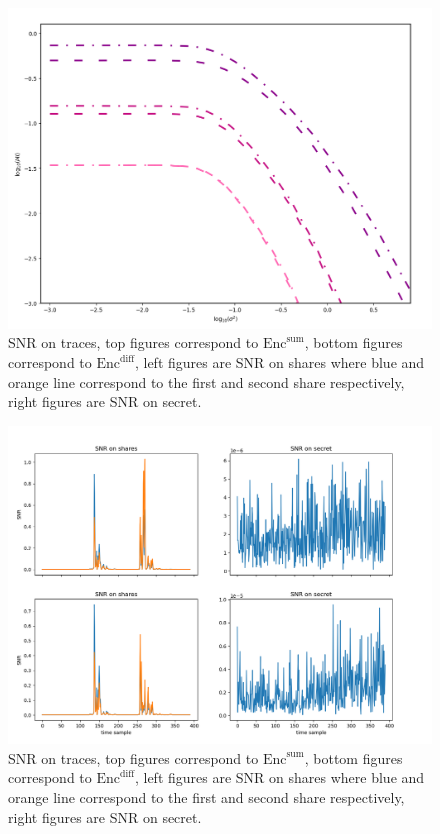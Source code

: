 \documentclass{llncs}
\begin{document}
\begin{figure}
	\vspace*{-0.0cm}
	\hspace*{0.0cm}\centering \includegraphics[width=12.0cm]{figures/MI_23_234.png}
	\vspace*{0.3cm}
	\caption{SNR on traces, top figures correspond to $\text{Enc}^{\text{sum}}$, bottom figures correspond to $\text{Enc}^{\text{diff}}$, left figures are SNR on shares where blue and orange line correspond to the first and second share respectively, right figures are SNR on secret.}\label{fig:miq23}\vspace*{-0.0cm}
\end{figure}
\begin{figure}
	\vspace*{-0.0cm}
	\hspace*{0.0cm}\centering \includegraphics[width=12.0cm]{figures/snr_2shares.png}
	\vspace*{0.3cm}
	\caption{SNR on traces, top figures correspond to $\text{Enc}^{\text{sum}}$, bottom figures correspond to $\text{Enc}^{\text{diff}}$, left figures are SNR on shares where blue and orange line correspond to the first and second share respectively, right figures are SNR on secret.}\label{fig:snr2}\vspace*{-0.0cm}
\end{figure}


\end{document}

